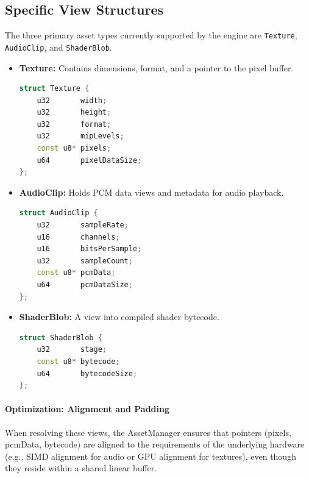 \subsection{Specific View Structures}

The three primary asset types currently supported by the engine are \texttt{Texture}, \texttt{AudioClip}, and \texttt{ShaderBlob}.

\begin{itemize}
    \item \textbf{Texture:} Contains dimensions, format, and a pointer to the pixel buffer.
    \begin{lstlisting}[language=C++]
struct Texture {
    u32       width;
    u32       height;
    u32       format;
    u32       mipLevels;
    const u8* pixels;
    u64       pixelDataSize;
};
    \end{lstlisting}
    
    \item \textbf{AudioClip:} Holds PCM data views and metadata for audio playback.
    \begin{lstlisting}[language=C++]
struct AudioClip {
    u32       sampleRate;
    u16       channels;
    u16       bitsPerSample;
    u32       sampleCount;
    const u8* pcmData;
    u64       pcmDataSize;
};
    \end{lstlisting}
    
    \item \textbf{ShaderBlob:} A view into compiled shader bytecode.
    \begin{lstlisting}[language=C++]
struct ShaderBlob {
    u32       stage;
    const u8* bytecode;
    u64       bytecodeSize;
};
    \end{lstlisting}
\end{itemize}


\paragraph{Optimization: Alignment and Padding}

When resolving these views, the AssetManager ensures that pointers (pixels, pcmData, bytecode) are aligned to the requirements of the underlying hardware (e.g., SIMD alignment for audio or GPU alignment for textures), even though they reside within a shared linear buffer.


